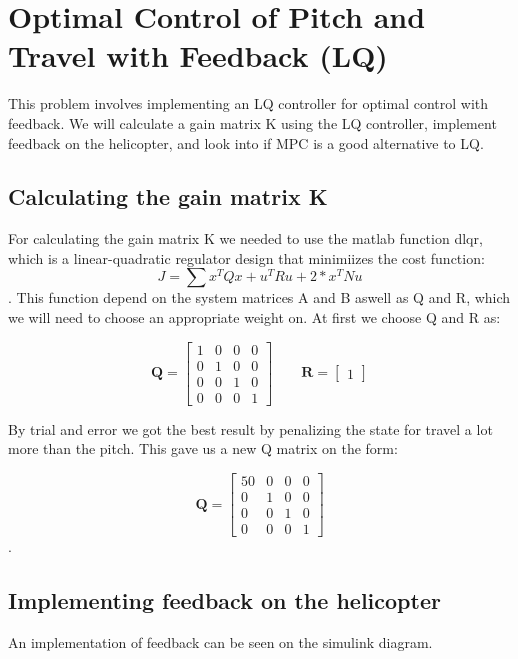 \section{Optimal Control of Pitch and Travel with Feedback (LQ)}\label{sec:prob3}
This problem involves implementing an LQ controller for optimal control with feedback. We will calculate a gain matrix K using the LQ controller, implement feedback on the helicopter, and look into if MPC is a good alternative to LQ.

\subsection{Calculating the gain matrix K}
For calculating the gain matrix K we needed to use the matlab function dlqr, which is a linear-quadratic regulator design that minimiizes the cost function:
\begin{equation}
J = \sum {x^TQx + u^TRu + 2*x^TNu}
\end{equation}.
This function depend on the system matrices A and B aswell as Q and R, which we will need to choose an appropriate weight on. At first we choose Q and R as:

\begin{equation}
\mathbf{Q} =
\begin{bmatrix}
1 & 0 & 0 & 0 \\
0 & 1 & 0 & 0 \\
0 & 0 & 1 & 0 \\
0 & 0 & 0 & 1
\end{bmatrix}
\qquad\mathbf{R}=
\begin{bmatrix}
1
\end{bmatrix}
\end{equation}

 By trial and error we got the best result by penalizing the state for travel a lot more than the pitch. This gave us a new Q matrix on the form:

\begin{equation}
\mathbf{Q} =
\begin{bmatrix}
50 & 0 & 0 & 0 \\
0 & 1 & 0 & 0 \\
0 & 0 & 1 & 0 \\
0 & 0 & 0 & 1
\end{bmatrix}
\end{equation}.


\subsection{Implementing feedback on the helicopter}
An implementation of feedback can be seen on the simulink diagram.

